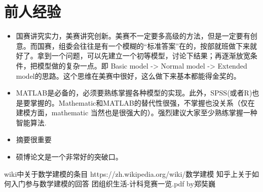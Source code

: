 \documentclass[11pt, a4paper, UTF8]{ctexart}
\begin{document}
\section{前人经验}
\begin{itemize}
\item 国赛讲究实力，美赛讲究创新。美赛不一定要多高级的方法，但是一定要有创意。而国赛，组委会往往是有一个模糊的“标准答案”在的，按部就班做下来就好了。拿到一个问题，可以先建立一个初等模型，讨论下结果；再逐渐放宽条件，把模型做的复杂一点。即 Basic model -> Normal model -> Extended model的思路。这个思维在美赛中很好，这么做下来基本都能得金奖的。
\item MATLAB是必备的，必须要熟练掌握各种模型的实现。此外，SPSS(或者R)也是要掌握的。Mathematic和MATLAB的替代性很强，不掌握也没关系（仅在建模方面，mathematic 当然也是很强大的）。强烈建议大家至少熟练掌握一种智能算法.
\item 摘要很重要
\item 硕博论文是一个非常好的突破口。
\end{itemize}

\newpage

\begin{thebibliography}{99}
 wiki中关于数学建模的条目 https://zh.wikipedia.org/wiki/数学建模
 知乎上关于如何入门参与数学建模的回答 
 团组织生活-计科竞赛一览.pdf by郑奘巍
\end{thebibliography}
\end{document}
